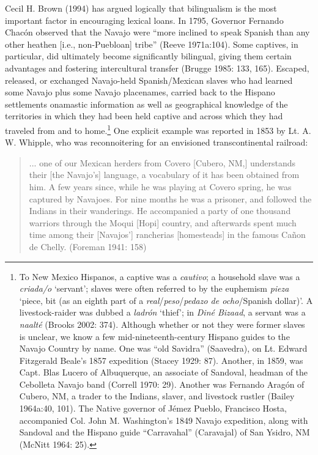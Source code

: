 Cecil H. Brown (1994) has argued logically that bilingualism is the most important factor in encouraging lexical loans.  In 1795, Governor Fernando Chacón observed that the Navajo were “more inclined to speak Spanish than any other heathen [i.e., non-Puebloan] tribe” (Reeve 1971a:104).  Some captives, in particular, did ultimately become significantly bilingual, giving them certain advantages and fostering intercultural transfer (Brugge 1985: 133, 165).  Escaped, released, or exchanged Navajo-held Spanish/Mexican slaves who had learned some Navajo plus some Navajo placenames, carried back to the Hispano settlements onamastic information as well as geographical knowledge of the territories in which they had been held captive and across which they had traveled from and to home.\footnote{To New Mexico Hispanos, a captive was a \textit{cautivo}; a household slave was a \textit{criada/o} ‘servant’; slaves were often referred to by the euphemism \textit{pieza} ‘piece, bit (as an eighth part of a \textit{real}/\textit{peso}/\textit{pedazo de ocho}/Spanish dollar)’.  A livestock-raider was dubbed a \textit{ladrón} ‘thief’; in \textit{Diné Bizaad}, a servant was a \textit{naalté} (Brooks 2002: 374). Although whether or not they were former slaves is unclear, we know a few mid-nineteenth-century Hispano guides to the Navajo Country by name.  One was “old Savidra” (Saavedra), on Lt. Edward Fitzgerald Beale’s 1857 expedition (Stacey 1929: 87).  Another, in 1859, was Capt. Blas Lucero of Albuquerque, an associate of Sandoval, headman of the Cebolleta Navajo band (Correll 1970: 29).  Another was Fernando Aragón of Cubero, NM, a trader to the Indians, slaver, and livestock rustler (Bailey 1964a:40, 101).  The Native governor of Jémez Pueblo, Francisco Hosta, accompanied Col. John M. Washington’s 1849 Navajo expedition, along with Sandoval and the Hispano guide “Carravahal” (Caravajal) of San Ysidro, NM (McNitt 1964: 25).}  One explicit example was reported in 1853 by Lt. A. W. Whipple, who was reconnoitering for an envisioned transcontinental railroad:

\begin{quote}
	... one of our Mexican herders from Covero [Cubero, NM,] understands their [the Navajo’s] language, a vocabulary of it has been obtained from him.  A few years since, while he was playing at Covero spring, he was captured by Navajoes.  For nine months he was a prisoner, and followed the Indians in their wanderings.  He accompanied a party of one thousand warriors through the Moqui [Hopi] country, and afterwards spent much time among their [Navajos’] rancherias [homesteads] in the famous Cañon de Chelly.  (Foreman 1941: 158)
\end{quote}

